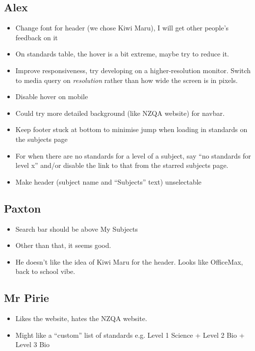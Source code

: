 \documentclass{article}
\begin{document}
\subsection*{Alex}
\begin{itemize}
    \item Change font for header (we chose Kiwi Maru), I will get other people's feedback on it
    \item On standards table, the hover is a bit extreme, maybe try to reduce it.
    \item Improve responsiveness, try developing on a higher-resolution monitor. Switch to media query on \textit{resolution} rather than how wide the screen is in pixels.
    \item Disable hover on mobile
    \item Could try more detailed background (like NZQA website) for navbar.
    \item Keep footer stuck at bottom to minimise jump when loading in standards on the subjects page
    \item For when there are no standards for a level of a subject, say ``no standards for level x'' and/or disable the link to that from the starred subjects page.
    \item Make header (subject name and ``Subjects'' text) unselectable
\end{itemize}

\subsection*{Paxton}
\begin{itemize}
    \item Search bar should be above My Subjects
    \item Other than that, it seems good. 
    \item He doesn't like the idea of Kiwi Maru for the header. Looks like OfficeMax, back to school vibe.
\end{itemize}

\subsection*{Mr Pirie}
\begin{itemize}
    \item Likes the website, hates the NZQA website.
    \item Might like a ``custom'' list of standards e.g. Level 1 Science + Level 2 Bio + Level 3 Bio
\end{itemize}
\end{document}
